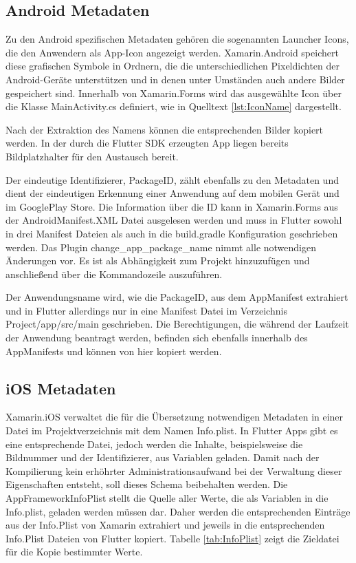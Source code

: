 \subsection{Android Metadaten}
Zu den Android spezifischen Metadaten gehören die sogenannten Launcher Icons, die den Anwendern als App-Icon angezeigt werden. Xamarin.Android speichert diese grafischen Symbole in Ordnern, die die unterschiedlichen Pixeldichten der Android-Geräte unterstützen und in denen unter Umständen auch andere Bilder gespeichert sind.  Innerhalb von Xamarin.Forms wird das ausgewählte Icon über die Klasse MainActivity.cs definiert, wie in Quelltext \ref{lst:IconName} dargestellt. 



Nach der Extraktion des Namens können die entsprechenden Bilder kopiert werden.  In der durch die Flutter SDK erzeugten App liegen bereits Bildplatzhalter für den Austausch bereit.

Der eindeutige Identifizierer,  PackageID,  zählt ebenfalls zu den Metadaten und dient der eindeutigen Erkennung einer Anwendung auf dem mobilen Gerät und im GooglePlay Store.  Die Information über die ID kann in Xamarin.Forms aus der AndroidManifest.XML Datei ausgelesen werden und muss in Flutter sowohl in drei Manifest Dateien  als auch in die \glq build.gradle\grq{} Konfiguration geschrieben werden.  Das Plugin \glq change\_app\_package\_name\grq{}  nimmt alle notwendigen Änderungen vor.  Es ist als Abhängigkeit zum Projekt hinzuzufügen und anschließend über die Kommandozeile auszuführen. 

Der Anwendungsname wird, wie die PackageID,  aus dem AppManifest extrahiert und in Flutter allerdings nur in eine Manifest Datei im Verzeichnis \glq Project/app/src/main\grq{} geschrieben.  Die Berechtigungen,  die während der Laufzeit der Anwendung beantragt werden,  befinden sich ebenfalls innerhalb des AppManifests und können von hier kopiert werden.

\subsection{iOS Metadaten}
Xamarin.iOS verwaltet die für die Übersetzung notwendigen Metadaten in einer Datei im  Projektverzeichnis mit dem Namen Info.plist.  In Flutter Apps gibt es eine entsprechende Datei,  jedoch werden die Inhalte,  beispielsweise die Bildnummer und der Identifizierer,  aus Variablen geladen.  Damit nach der Kompilierung kein erhöhrter Administrationsaufwand bei der Verwaltung dieser Eigenschaften entsteht,  soll dieses Schema beibehalten werden.  Die AppFrameworkInfoPlist stellt die Quelle aller Werte,  die als Variablen in die Info.plist, geladen werden müssen dar.   Daher werden die entsprechenden Einträge aus der Info.Plist von Xamarin extrahiert und jeweils in die entsprechenden Info.Plist Dateien von Flutter kopiert.  Tabelle \ref{tab:InfoPlist} zeigt die Zieldatei für die Kopie bestimmter Werte.

